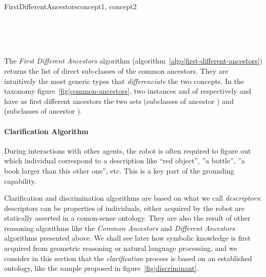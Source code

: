 \small
\begin{pseudocode}[ruled]{FirstDifferentAncestors}{concept1, concept2}
\label{algo|first-different-ancestors}

\BEGIN
{} \GETS {} \\
 \GETS {} \cup {} \\

 \\
\END

\end{pseudocode}
\normalsize

The \emph{First Different Ancestors} algorithm
(algorithm~\ref{algo|first-different-ancestors}) returns the list of direct
sub-classes of the common ancestors. They are intuitively the most generic
types that \emph{differenciate} the two concepts. In the taxonomy
figure~\ref{fig|common-ancestors}, two instances  and  of
respectively  and  have as first different
ancestors the two sets  (subclasses of ancestor
) and  (subclasses of
ancestor ).

\paragraph{Clarification Algorithm}
\label{sect|clarify}

During interactions with other agents, the robot is often required to figure
out which individual correspond to a description like ``red object'', ''a
bottle'', ''a book larger than this other one'', etc. This is a key part of the
grounding capability.

Clarification and discrimination algorithms are based on what we call
\emph{descriptors}: descriptors can be properties of individuals, either
acquired by the robot are statically asserted in a comon-sense ontology. They
are also the result of other reasoning algorithms like the \emph{Common
Ancestors} and \emph{Different Ancestors} algorithms presented above.
We shall see later how symbolic knowledge is first acquired from geometric
reasoning or natural language processing, and we consider in this section that
the \emph{clarification} process is based on an established ontology, like the
sample proposed in figure~\ref{fig|discriminant}.

